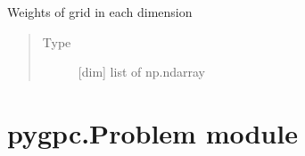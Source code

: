 \documentclass[letterpaper,10pt,english,openany,oneside]{sphinxmanual}
\begin{document}
\begin{fulllineitems}
\begin{fulllineitems}
\label{\detokenize{pygpc:pygpc.Grid.TensorGrid.weights_dim_list}}
Weights of grid in each dimension
\begin{quote}\begin{description}
\item[{Type}] \leavevmode
{[}dim{]} list of np.ndarray

\end{description}\end{quote}

\end{fulllineitems}


\end{fulllineitems}



\section{pygpc.Problem module}
\label{\detokenize{pygpc:module-pygpc.Problem}}\label{\detokenize{pygpc:pygpc-problem-module}}
\end{document}
